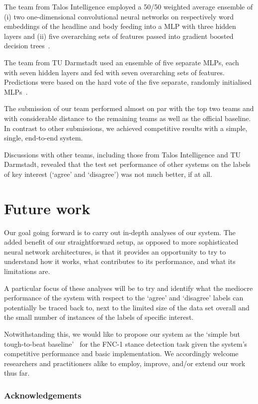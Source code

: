 \documentclass{article}
\begin{document}
The team from Talos Intelligence employed a 50/50 weighted average ensemble of (i) two one-dimensional convolutional neural networks on respectively word embeddings of the headline and body feeding into a MLP with three hidden layers and (ii) five overarching sets of features passed into gradient boosted decision trees~\cite{talos}.

The team from TU Darmstadt used an ensemble of five separate MLPs, each with seven hidden layers and fed with seven overarching sets of features. Predictions were based on the hard vote of the five separate, randomly initialised MLPs~\cite{athene}.

The submission of our team performed almost on par with the top two teams and with considerable distance to the remaining teams as well as the official baseline. In contrast to other submissions, we achieved competitive results with a simple, single, end-to-end system.

Discussions with other teams, including those from Talos Intelligence and TU Darmstadt, revealed that the test set performance of other systems on the labels of key interest (`agree' and `disagree') was not much better, if at all.

\section{Future work}

Our goal going forward is to carry out in-depth analyses of our system.
The added benefit of our straightforward setup, as opposed to more sophisticated neural network architectures, is that it provides an opportunity to try to understand how it works, what contributes to its performance, and what its limitations are.

A particular focus of these analyses will be to try and identify what the mediocre performance of the system with respect to the `agree' and `disagree' labels can potentially be traced back to, next to the limited size of the data set overall and the small number of instances of the labels of specific interest.

Notwithstanding this, we would like to propose our system as the `simple but tough-to-beat baseline'~\cite{baseline} for the FNC-1 stance detection task given the system's competitive performance and basic implementation. We accordingly welcome researchers and practitioners alike to employ, improve, and/or extend our work thus far.

\subsubsection*{Acknowledgements}
\end{document}

